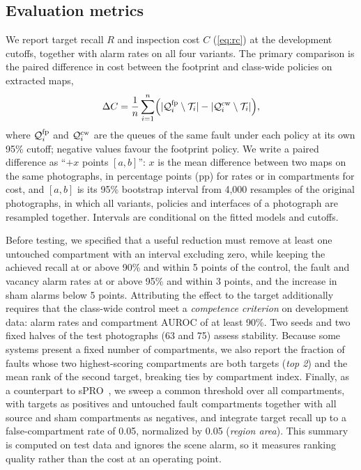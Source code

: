 \documentclass[10pt,twocolumn,letterpaper]{article}
\begin{document}
\subsection{Evaluation metrics}
\label{sec:protocol}
We report target recall $R$ and inspection cost $C$ (\cref{eq:rc}) at the development cutoffs, together with alarm rates on all four variants. The primary comparison is the paired difference in cost between the footprint and class-wide policies on extracted maps,
\begin{equation}
 \Delta C=\frac{1}{n}\sum_{i=1}^{n}\Bigl(|\mathcal{Q}_i^{\text{fp}}\setminus\mathcal{T}_i|-|\mathcal{Q}_i^{\text{cw}}\setminus\mathcal{T}_i|\Bigr),
 \label{eq:delta}
\end{equation}
where $\mathcal{Q}_i^{\text{fp}}$ and $\mathcal{Q}_i^{\text{cw}}$ are the queues of the same fault under each policy at its own 95\% cutoff; negative values favour the footprint policy. We write a paired difference as ``$+x$ points $[a, b]$'': $x$ is the mean difference between two maps on the same photographs, in percentage points (pp) for rates or in compartments for cost, and $[a,b]$ is its 95\% bootstrap interval from 4,000 resamples of the original photographs, in which all variants, policies and interfaces of a photograph are resampled together. Intervals are conditional on the fitted models and cutoffs.

Before testing, we specified that a useful reduction must remove at least one untouched compartment with an interval excluding zero, while keeping the achieved recall at or above 90\% and within 5 points of the control, the fault and vacancy alarm rates at or above 95\% and within 3 points, and the increase in sham alarms below 5 points. Attributing the effect to the target additionally requires that the class-wide control meet a \emph{competence criterion} on development data: alarm rates and compartment AUROC of at least 90\%. Two seeds and two fixed halves of the test photographs (63 and 75) assess stability. Because some systems present a fixed number of compartments, we also report the fraction of faults whose two highest-scoring compartments are both targets (\emph{top 2}) and the mean rank of the second target, breaking ties by compartment index. Finally, as a counterpart to sPRO~\cite{bergmann2022,fucka2025}, we sweep a common threshold over all compartments, with targets as positives and untouched fault compartments together with all source and sham compartments as negatives, and integrate target recall up to a false-compartment rate of 0.05, normalized by 0.05 (\emph{region area}). This summary is computed on test data and ignores the scene alarm, so it measures ranking quality rather than the cost at an operating point.
\end{document}
